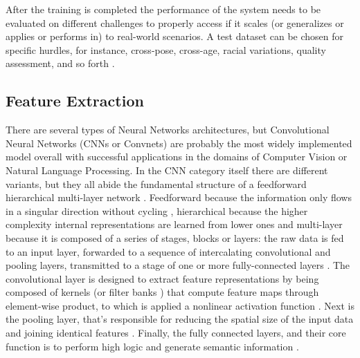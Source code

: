\documentclass[class=report, crop=false, a4paper, 12pt]{standalone}
\begin{document}
\par After the training is completed the performance of the system needs to be evaluated on different challenges to properly access if it scales (or generalizes or applies or performs in) to real-world scenarios. A test dataset can be chosen for specific hurdles, for instance, cross-pose, cross-age, racial variations, quality assessment, and so forth \autocite{duElementsEndtoendDeep2022}.


\subsection{Feature Extraction}

There are several types of Neural Networks architectures, but Convolutional Neural Networks (CNNs or Convnets) are probably the most widely implemented model overall \autocite{yamashitaConvolutionalNeuralNetworks2018, liSurveyConvolutionalNeural2022} with successful applications in the domains of Computer Vision \autocite{krizhevskyImageNetClassificationDeep2012,taigmanDeepFaceClosingGap2014,tompsonEfficientObjectLocalization2015, zhangImprovedBreastCancer2021} or Natural Language Processing\autocite{abdel-hamidConvolutionalNeuralNetworks2014, wangGenCNNConvolutionalArchitecture2015, xiangConvolutionalNeuralNetworkbased2020}. In the CNN category itself there are different variants, but they all abide the fundamental structure of a feedforward hierarchical multi-layer network . Feedforward because the information only flows in a singular direction without cycling \autocite{zellSimulationNeuronalerNetze1994}, hierarchical because the higher complexity internal representations are learned from lower ones \autocite{lecunDeepLearning2015, zhuBCNNBranchConvolutional2017} and multi-layer because it is composed of a series of stages, blocks or layers: the raw data is fed to an input layer, forwarded to a sequence of intercalating convolutional and pooling layers, transmitted to a stage of one or more fully-connected layers \autocite{lecunDeepLearning2015, yamashitaConvolutionalNeuralNetworks2018, guRecentAdvancesConvolutional2018, alzubaidiReviewDeepLearning2021}. The convolutional layer is designed to extract feature representations by being composed of kernels (or filter banks \autocite{lecunDeepLearning2015}) that compute feature maps through element-wise product, to which is applied a nonlinear activation function \autocite{guRecentAdvancesConvolutional2018,yamashitaConvolutionalNeuralNetworks2018}. Next is the pooling layer, that's responsible for reducing the spatial size of the input data \autocite{guRecentAdvancesConvolutional2018} and joining identical features \autocite{lecunDeepLearning2015}. Finally, the fully connected layers, and their core function is to perform high logic and generate semantic information \autocite{guRecentAdvancesConvolutional2018}.
\end{document}
